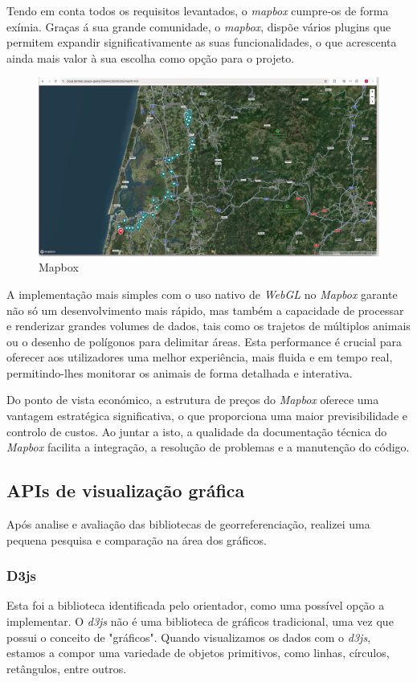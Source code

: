 Tendo em conta todos os requisitos levantados, o \textit{mapbox} cumpre-os de forma exímia. Graças á sua grande comunidade, o \textit{mapbox}, dispõe vários plugins que permitem expandir significativamente as suas funcionalidades, o que acrescenta ainda mais valor à sua escolha como opção para o projeto.

\begin{figure}[h!]
    \centering
    \includegraphics[width=\textwidth]{figs/mapbox.png}
    \caption[Mapbox]{Mapbox}
    \label{fig:mapbox}
\end{figure}

A implementação mais simples com o uso nativo de \textit{WebGL} no \textit{Mapbox} garante não só um desenvolvimento mais rápido, mas também a capacidade de processar e renderizar grandes volumes de dados, tais como os trajetos de múltiplos animais ou o desenho de polígonos para delimitar áreas. Esta performance é crucial para oferecer aos utilizadores uma melhor experiência, mais fluida e em tempo real, permitindo-lhes monitorar os animais de forma detalhada e interativa.

Do ponto de vista económico, a estrutura de preços do \textit{Mapbox} oferece uma vantagem estratégica significativa, o que proporciona uma maior previsibilidade e controlo de custos. Ao juntar a isto, a qualidade da documentação técnica do \textit{Mapbox} facilita a integração, a resolução de problemas e a manutenção do código.


\subsection{APIs de visualização gráfica} %
Após analise e avaliação das bibliotecas de georreferenciação, realizei uma pequena pesquisa e comparação na área dos gráficos.


\subsubsection{\textbf{D3js}}\label{sec:d3js}
Esta foi a biblioteca identificada pelo orientador, como uma possível opção a implementar. O \textit{d3js} não é uma biblioteca de gráficos tradicional, uma vez que possui o conceito de "gráficos". Quando visualizamos os dados com o \textit{d3js}, estamos a compor uma variedade de objetos primitivos, como linhas, círculos, retângulos, entre outros. 

